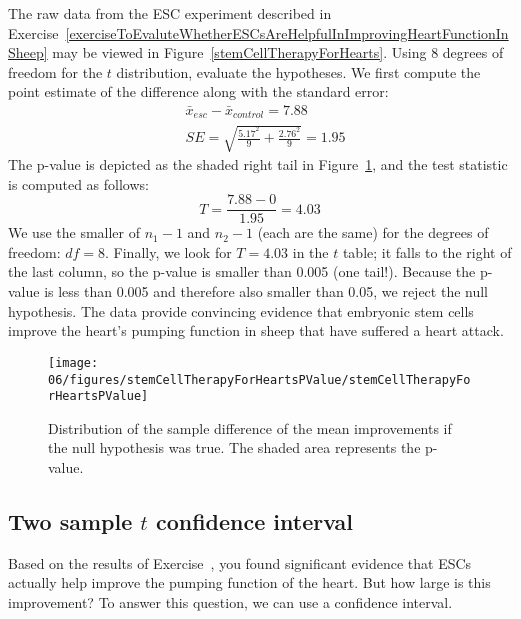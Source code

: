 \begin{example}{The raw data from the ESC experiment described in Exercise~\ref{exerciseToEvaluteWhetherESCsAreHelpfulInImprovingHeartFunctionInSheep} may be viewed in Figure~\ref{stemCellTherapyForHearts}. Using 8 degrees of freedom for the $t$ distribution, evaluate the hypotheses.}
We first compute the point estimate of the difference along with the standard error:
\begin{align*}
& \bar{x}_{esc} - \bar{x}_{control} = 7.88 \\
& SE = \sqrt{\frac{5.17^2}{9} + \frac{2.76^2}{9}} = 1.95
\end{align*}
The p-value is depicted as the shaded right tail in Figure~\ref{stemCellTherapyForHeartsPValue}, and the test statistic is computed as follows:
$$T = \frac{7.88 - 0}{1.95} = 4.03$$
We use the smaller of $n_1-1$ and $n_2-1$ (each are the same) for the degrees of freedom: $df=8$. Finally, we look for $T=4.03$ in the $t$ table; it falls to the right of the last column, so the p-value is smaller than 0.005 (one tail!). Because the p-value is less than 0.005 and therefore also smaller than 0.05, we reject the null hypothesis. The data provide convincing evidence that embryonic stem cells improve the heart's pumping function in sheep that have suffered a heart attack.
\end{example}
\begin{figure}
\centering
\texttt{[image: 06/figures/stemCellTherapyForHeartsPValue/stemCellTherapyForHeartsPValue]}
\caption{Distribution of the sample difference of the mean improvements if the null hypothesis was true. The shaded area represents the p-value.}
\label{stemCellTherapyForHeartsPValue}
\end{figure}

\subsection{Two sample $t$ confidence interval}

Based on the results of Exercise~, you found significant evidence that ESCs actually help improve the pumping function of the heart. But how large is this improvement? To answer this question, we can use a confidence interval. 


